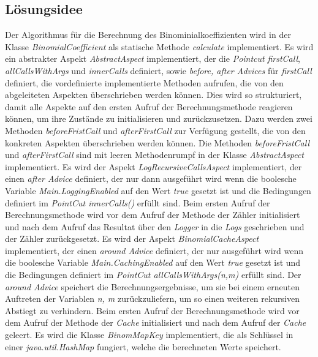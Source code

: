 \documentclass[11pt, a4paper, twoside]{article}   	%
\begin{document}
\subsection{Lösungsidee} 
Der Algorithmus für die Berechnung des Binominialkoeffizienten wird in der Klasse \emph{BinomialCoefficient} als statische Methode \emph{calculate} implementiert.
\newline
\newline
Es wird ein abstrakter Aspekt \emph{AbstractAspect} implementiert, der die \emph{Pointcut} \emph{firstCall}, \emph{allCallsWithArgs} und \emph{innerCalls} definiert, sowie \emph{before, after Advices} für \emph{firstCall} definiert, die vordefinierte implementierte Methoden aufrufen, die von den abgeleiteten Aspekten überschrieben werden können. Dies wird so strukturiert, damit alle Aspekte auf den ersten Aufruf der Berechnungsmethode reagieren können, um ihre Zustände zu initialisieren und zurückzusetzen. Dazu werden zwei Methoden \emph{beforeFristCall} und \emph{afterFirstCall} zur Verfügung gestellt, die von den konkreten Aspekten überschrieben werden können. Die Methoden \emph{beforeFristCall} und \emph{afterFirstCall} sind mit leeren Methodenrumpf in der Klasse \emph{AbstractAspect} implementiert. 
\newline
\newline
Es wird der Aspekt \emph{LogRecursiveCallsAspect} implementiert, der einen \emph{after Advice} definiert, der nur dann ausgeführt wird wenn die boolesche Variable  \emph{Main.LoggingEnabled} auf den Wert \emph{true} gesetzt ist und die Bedingungen definiert im \emph{PointCut innerCalls()} erfüllt sind. Beim ersten Aufruf der Berechnungsmethode wird vor dem Aufruf der Methode der Zähler initialisiert und nach dem Aufruf das Resultat über den \emph{Logger} in die \emph{Logs} geschrieben und der Zähler zurückgesetzt.
\newline
\newline
Es wird der Aspekt \emph{BinomialCacheAspect} implementiert, der einen \emph{around Advice} definiert, der nur ausgeführt wird  wenn die boolesche Variable  \emph{Main.CachingEnabled} auf den Wert \emph{true} gesetzt ist und die Bedingungen definiert im \emph{PointCut allCallsWithArgs(n,m)} erfüllt sind. Der \emph{around Advice} speichert die Berechnungsergebnisse, um sie bei einem erneuten Auftreten der Variablen \emph{n, m} zurückzuliefern, um so einen weiteren rekursiven Abstiegt zu verhindern. Beim ersten Aufruf der Berechnungsmethode wird vor dem Aufruf der Methode der \emph{Cache} initialisiert und nach dem Aufruf der \emph{Cache} geleert. Es wird die Klasse \emph{BinomMapKey} implementiert, die als Schlüssel in einer \emph{java.util.HashMap} fungiert, welche die berechneten Werte speichert.
\end{document}
